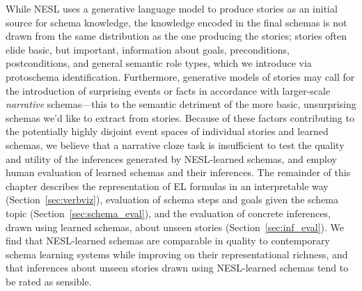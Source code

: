 While NESL uses a generative language model to produce stories as an initial source for schema knowledge, the knowledge encoded in the final schemas is not drawn from the same distribution as the one producing the stories; stories often elide basic, but important, information about goals, preconditions, postconditions, and general semantic role types, which we introduce via protoschema identification. Furthermore, generative models of stories may call for the introduction of surprising events or facts in accordance with larger-scale \textit{narrative} schemas---this to the semantic detriment of the more basic, unsurprising schemas we'd like to extract from stories. Because of these factors contributing to the potentially highly disjoint event spaces of individual stories and learned schemas, we believe that a narrative cloze task is insufficient to test the quality and utility of the inferences generated by NESL-learned schemas, and employ human evaluation of learned schemas and their inferences. The remainder of this chapter describes the representation of EL formulas in an interpretable way (Section~\ref{sec:verbviz}), evaluation of schema steps and goals given the schema topic (Section~\ref{sec:schema_eval}), and the evaluation of concrete inferences, drawn using learned schemas, about unseen stories (Section~\ref{sec:inf_eval}). We find that NESL-learned schemas are comparable in quality to contemporary schema learning systems while improving on their representational richness, and that inferences about unseen stories drawn using NESL-learned schemas tend to be rated as sensible.